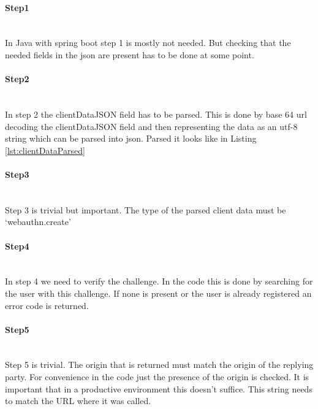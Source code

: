 \documentclass[a4paper, 11pt]{scrartcl}
\begin{document}


\paragraph{Step1} \hfill \\ 
In Java with spring boot step 1 is mostly not needed. But checking that the needed fields in the json are present has to be done at some point.
\paragraph{Step2} \hfill \\ 
In step 2 the clientDataJSON field has to be parsed. This is done by base 64 url decoding the clientDataJSON field and then representing the data as an \gls{utf-8} string which can be parsed into \gls{json}. Parsed it looks like in Listing \ref{lst:clientDataParsed}



\paragraph{Step3}\hfill \\ 
Step 3 is trivial but important. The type of the parsed client data must be `webauthn.create'

\paragraph{Step4}\hfill \\ 
In step 4 we need to verify the challenge. In the code this is done by searching for the user with this challenge. If none is present or the user is already registered an error code is returned.

\paragraph{Step5}\hfill \\ 
Step 5 is trivial. The origin that is returned must match the origin of the replying party. For convenience in the code just the presence of the origin is checked. It is important that in a productive environment this doesn't suffice. This string needs to match the URL where it was called.
\end{document}
